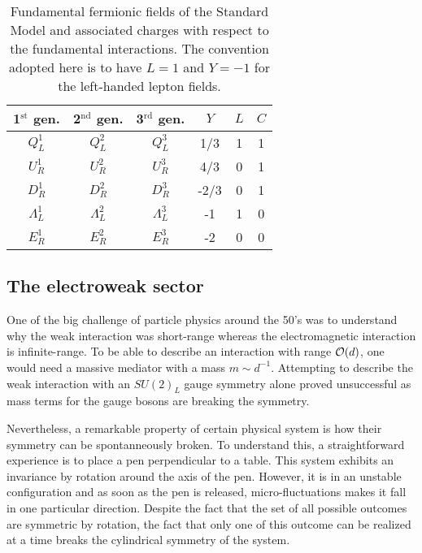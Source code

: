     \begin{table}
        \centering
        \begin{tabular}{|ccc||ccc|}
            \hline
            1$^\text{st}$ gen. & 2$^\text{nd}$ gen. & 3$^\text{rd}$ gen.  & $Y$  & $L$ & $C$\\
            \hline
            \hline
            $Q^1_L$            & $Q^2_L$            & $Q^3_L$             &  1/3 & 1   & 1  \\
            $U^1_R$            & $U^2_R$            & $U^3_R$             &  4/3 & 0   & 1  \\
            $D^1_R$            & $D^2_R$            & $D^3_R$             & -2/3 & 0   & 1  \\
            \hline
            \hline
            $\Lambda^1_L$      & $\Lambda^2_L$      & $\Lambda^3_L$       &  -1  & 1   & 0  \\
            $E^1_R$            & $E^2_R$            & $E^3_R$             &  -2  & 0   & 0  \\
            \hline
        \end{tabular}
        \caption{Fundamental fermionic fields of the Standard Model and associated charges
        with respect to the fundamental interactions. The convention adopted here is to
        have $L = 1$ and $Y = -1$ for the left-handed lepton fields.}
        \label{tab:StandardModelFields}
    \end{table}

    \subsection{The electroweak sector}

    One of the big challenge of particle physics around the 50's was to understand why
    the weak interaction was short-range whereas the electromagnetic interaction is
    infinite-range. To be able to describe an interaction with range $\mathcal{O}(d)$, one
    would need a massive mediator with a mass $m \sim d^{-1}$. Attempting to describe the
    weak interaction with an $SU(2)_L$ gauge symmetry alone proved unsuccessful as mass terms
    for the gauge bosons are breaking the symmetry.

    Nevertheless, a remarkable property of certain physical system is how their symmetry can
    be spontanneously broken. To understand this, a straightforward experience is to
    place a pen perpendicular
    to a table. This system exhibits an invariance by rotation around the axis of the pen.
    However, it is in an unstable configuration and as soon as the pen is released,
    micro-fluctuations makes it fall in one particular direction. Despite the fact that the
    set of all possible outcomes are symmetric by rotation, the fact that only one of this
    outcome can be realized at a time breaks the cylindrical symmetry of the system.

